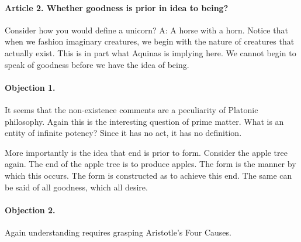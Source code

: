 \documentclass{ucetd}
\begin{document}
\paragraph{Article 2. Whether goodness is prior in idea to being?}
Consider how you would define a unicorn? A: A horse with a horn. Notice that when we fashion imaginary creatures, we begin with the nature of creatures that actually exist. This is in part what Aquinas is implying here. We cannot begin to speak of goodness before we have the idea of being.
\paragraph{Objection 1.}
It seems that the non-existence comments are a peculiarity of Platonic philosophy. Again this is the interesting question of prime matter. What is an entity of infinite potency? Since it has no act, it has no definition. 

More importantly is the idea that end is prior to form. Consider the apple tree again. The end of the apple tree is to produce apples. The form is the manner by which this occurs. The form is constructed as to achieve this end. The same can be said of all goodness, which all desire.
\paragraph{Objection 2.}
Again understanding requires grasping Aristotle's Four Causes.
\end{document}
